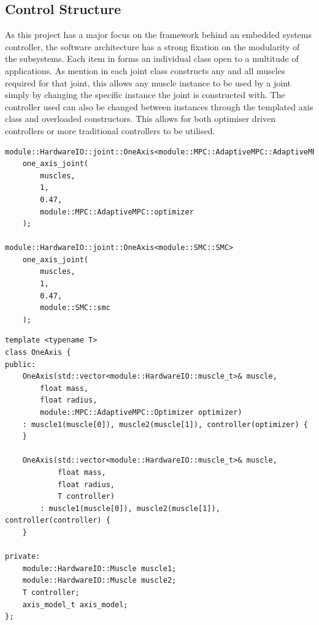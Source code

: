\documentclass[11pt,a4paper]{article}
\begin{document}
\subsection{Control Structure}
\label{sub:control_structure}
As this project has a major focus on the framework behind an embedded systems controller, the software architecture has a strong fixation on the modularity of the subsystems. Each item in  forms an individual class open to a multitude of applications. As mention in  each joint class constructs any and all muscles required for that joint, this allows any muscle instance to be used by a joint simply by changing the specific instance the joint is constructed with. The controller used can also be changed between instances through the templated axis class and overloaded constructors. This allows for both optimiser driven controllers or more traditional controllers to be utilised. 

\begin{listing}
\begin{verbatim}
module::HardwareIO::joint::OneAxis<module::MPC::AdaptiveMPC::AdaptiveMPC> 
    one_axis_joint(
        muscles, 
        1, 
        0.47, 
        module::MPC::AdaptiveMPC::optimizer
    );

module::HardwareIO::joint::OneAxis<module::SMC::SMC> 
    one_axis_joint(
        muscles, 
        1, 
        0.47,
        module::SMC::smc
    );
\end{verbatim}
\begin{verbatim}
template <typename T>
class OneAxis {
public:
    OneAxis(std::vector<module::HardwareIO::muscle_t>& muscle,
        float mass,
        float radius,
        module::MPC::AdaptiveMPC::Optimizer optimizer)
    : muscle1(muscle[0]), muscle2(muscle[1]), controller(optimizer) {
    }
    
    OneAxis(std::vector<module::HardwareIO::muscle_t>& muscle, 
            float mass, 
            float radius, 
            T controller)
        : muscle1(muscle[0]), muscle2(muscle[1]), controller(controller) {
    }
    
private:
    module::HardwareIO::Muscle muscle1;
    module::HardwareIO::Muscle muscle2;
    T controller;
    axis_model_t axis_model;
};
\end{verbatim}
\end{listing}
\end{document}
